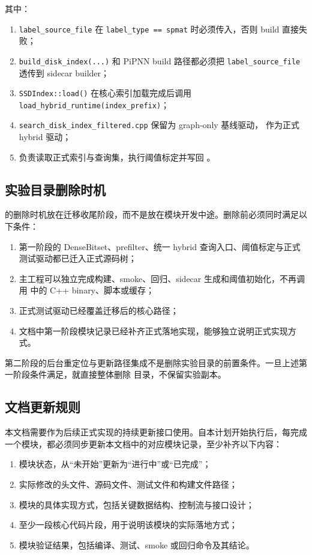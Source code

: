 \documentclass[UTF8]{ctexart}
\begin{document}
其中：

\begin{enumerate}
\item \texttt{label\_source\_file} 在 \texttt{label\_type == spmat} 时必须传入，否则 build 直接失败；
\item \texttt{build\_disk\_index(...)} 和 PiPNN build 路径都必须把 \texttt{label\_source\_file} 透传到 sidecar builder；
\item \texttt{SSDIndex::load()} 在核心索引加载完成后调用 \texttt{load\_hybrid\_runtime(index\_prefix)}；
\item \texttt{search\_disk\_index\_filtered.cpp} 保留为 graph-only 基线驱动， 作为正式 hybrid 驱动；
\item {} 负责读取正式索引与查询集，执行阈值标定并写回 。
\end{enumerate}

\subsection{实验目录删除时机}
 的删除时机放在迁移收尾阶段，而不是放在模块开发中途。删除前必须同时满足以下条件：

\begin{enumerate}
\item 第一阶段的 DenseBitset、prefilter、统一 hybrid 查询入口、阈值标定与正式测试驱动都已迁入正式源码树；
\item 主工程可以独立完成构建、smoke、回归、sidecar 生成和阈值初始化，不再调用  中的 C++ binary、脚本或缓存；
\item 正式测试驱动已经覆盖迁移后的核心路径；
\item 文档中第一阶段模块记录已经补齐正式落地实现，能够独立说明正式实现方式。
\end{enumerate}

第二阶段的后台重定位与更新路径集成不是删除实验目录的前置条件。一旦上述第一阶段条件满足，就直接整体删除  目录，不保留实验副本。

\subsection{文档更新规则}
本文档需要作为后续正式实现的持续更新接口使用。自本计划开始执行后，每完成一个模块，都必须同步更新本文档中的对应模块记录，至少补齐以下内容：

\begin{enumerate}
\item 模块状态，从“未开始”更新为“进行中”或“已完成”；
\item 实际修改的头文件、源码文件、测试文件和构建文件路径；
\item 模块的具体实现方式，包括关键数据结构、控制流与接口设计；
\item 至少一段核心代码片段，用于说明该模块的实际落地方式；
\item 模块验证结果，包括编译、测试、smoke 或回归命令及其结论。
\end{enumerate}
\end{document}
